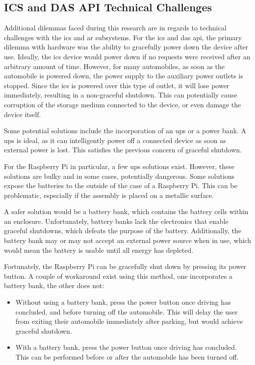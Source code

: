     \subsection{ICS and DAS API Technical Challenges}
        \par Additional dilemmas faced during this research are in regards to technical challenges with the \gls{ics} and \gls{ar} subsystems. For the \gls{ics} and \gls{das} \gls{api}, the primary dilemma with hardware was the ability to gracefully power down the device after use. Ideally, the \gls{ics} device would power down if no requests were received after an arbitrary amount of time. However, for many automobiles, as soon as the automobile is powered down, the power supply to the auxiliary power outlets is stopped. Since the \gls{ics} is powered over this type of outlet, it will lose power immediately, resulting in a non-graceful shutdown. This can potentially cause corruption of the storage medium connected to the device, or even damage the device itself.

        \par Some potential solutions include the incorporation of an \gls{ups} or a power bank. A \gls{ups} is ideal, as it can intelligently power off a connected device as soon as external power is lost. This satisfies the previous concern of graceful shutdown.

        \par For the Raspberry Pi in particular, a few \gls{ups} solutions exist. However, these solutions are bulky and in some cases, potentially dangerous. Some solutions expose the batteries to the outside of the case of a Raspberry Pi. This can be problematic, especially if the assembly is placed on a metallic surface.

        \par A safer solution would be a battery bank, which contains the battery cells within an enclosure. Unfortunately, battery banks lack the electronics that enable graceful shutdowns, which defeats the purpose of the battery. Additionally, the battery bank may or may not accept an external power source when in use, which would mean the battery is usable until all energy has depleted.

        \par Fortunately, the Raspberry Pi can be gracefully shut down by pressing its power button. A couple of workaround exist using this method, one incorporates a battery bank, the other does not:

        \begin{itemize}
            \item Without using a battery bank, press the power button once driving has concluded, and before turning off the automobile. This will delay the user from exiting their automobile immediately after parking, but would achieve graceful shutdown.
            \item With a battery bank, press the power button once driving has concluded. This can be performed before or after the automobile has been turned off.
        \end{itemize}

